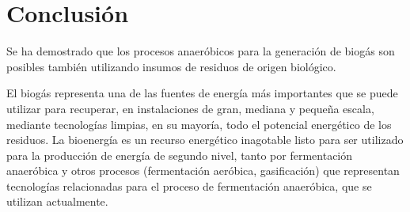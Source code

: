 \documentclass[a4paper,10pt]{article}
\begin{document}
\section{Conclusión}
Se ha demostrado que los procesos anaeróbicos para la generación de biogás son posibles también utilizando insumos de residuos de origen biológico.

El biogás representa una de las fuentes de energía más importantes que se puede utilizar para recuperar, en instalaciones de gran, mediana y pequeña escala, mediante tecnologías limpias, en su mayoría, todo el potencial energético de los residuos. La bioenergía es un recurso energético inagotable listo para ser utilizado para la producción de energía de segundo nivel, tanto por fermentación anaeróbica y otros procesos (fermentación aeróbica, gasificación) que representan tecnologías relacionadas para el proceso de fermentación anaeróbica, que se utilizan actualmente.

\listoffigures
\listoftables



\end{document}
